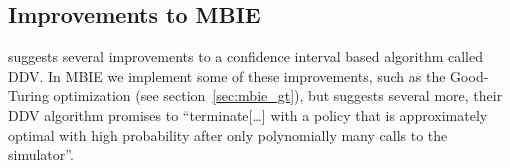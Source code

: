 \subsection{Improvements to MBIE}

\textcite{dietterich2013pac} suggests several improvements to a confidence interval based algorithm called DDV. 
In MBIE we implement some of these improvements, such as the Good-Turing optimization (see section~\ref{sec:mbie_gt}), 
but \textcite{dietterich2013pac} suggests several more, their DDV algorithm promises to ``terminate[\ldots] with a policy that is approximately optimal 
with high probability after only polynomially many calls to the simulator''.
